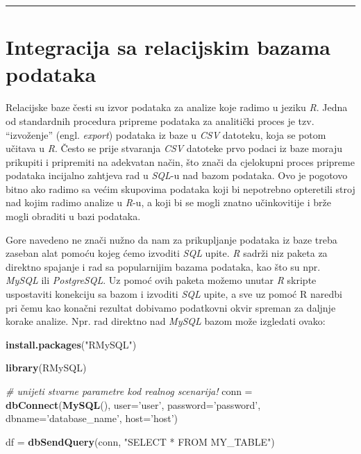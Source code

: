 \documentclass[]{book}
\newenvironment{Shaded}{\begin{snugshade}}{\end{snugshade}}
\newcommand{\KeywordTok}[1]{\textcolor[rgb]{0.13,0.29,0.53}{\textbf{#1}}}
\newcommand{\DataTypeTok}[1]{\textcolor[rgb]{0.13,0.29,0.53}{#1}}
\newcommand{\StringTok}[1]{\textcolor[rgb]{0.31,0.60,0.02}{#1}}
\newcommand{\CommentTok}[1]{\textcolor[rgb]{0.56,0.35,0.01}{\textit{#1}}}
\newcommand{\NormalTok}[1]{#1}
\theoremstyle{definition}
\theoremstyle{definition}
\theoremstyle{definition}
\theoremstyle{remark}
\begin{document}
\begin{center}\rule{0.5\linewidth}{\linethickness}\end{center}

\section{Integracija sa relacijskim bazama
podataka}\label{integracija-sa-relacijskim-bazama-podataka}

Relacijske baze česti su izvor podataka za analize koje radimo u jeziku
\emph{R}. Jedna od standardnih procedura pripreme podataka za analitički
proces je tzv. ``izvoženje'' (engl. \emph{export}) podataka iz baze u
\emph{CSV} datoteku, koja se potom učitava u \emph{R}. Često se prije
stvaranja \emph{CSV} datoteke prvo podaci iz baze moraju prikupiti i
pripremiti na adekvatan način, što znači da cjelokupni proces pripreme
podataka incijalno zahtjeva rad u \emph{SQL}-u nad bazom podataka. Ovo
je pogotovo bitno ako radimo sa većim skupovima podataka koji bi
nepotrebno opteretili stroj nad kojim radimo analize u \emph{R}-u, a
koji bi se mogli znatno učinkovitije i brže mogli obraditi u bazi
podataka.

Gore navedeno ne znači nužno da nam za prikupljanje podataka iz baze
treba zaseban alat pomoću kojeg ćemo izvoditi \emph{SQL} upite. \emph{R}
sadrži niz paketa za direktno spajanje i rad sa popularnijim bazama
podataka, kao što su npr. \emph{MySQL} ili \emph{PostgreSQL}. Uz pomoć
ovih paketa možemo unutar \emph{R} skripte uspostaviti konekciju sa
bazom i izvoditi \emph{SQL} upite, a sve uz pomoć R naredbi pri čemu kao
konačni rezultat dobivamo podatkovni okvir spreman za daljnje korake
analize. Npr. rad direktno nad \emph{MySQL} bazom može izgledati ovako:

\begin{Shaded}
\begin{Highlighting}[]
\KeywordTok{install.packages}\NormalTok{(}\StringTok{"RMySQL"}\NormalTok{)}

\KeywordTok{library}\NormalTok{(RMySQL)}

\CommentTok{# unijeti stvarne parametre kod realnog scenarija!}
\NormalTok{conn =}\StringTok{ }\KeywordTok{dbConnect}\NormalTok{(}\KeywordTok{MySQL}\NormalTok{(), }\DataTypeTok{user=}\StringTok{'user'}\NormalTok{, }\DataTypeTok{password=}\StringTok{'password'}\NormalTok{, }\DataTypeTok{dbname=}\StringTok{'database_name'}\NormalTok{, }\DataTypeTok{host=}\StringTok{'host'}\NormalTok{)}

\NormalTok{df =}\StringTok{ }\KeywordTok{dbSendQuery}\NormalTok{(conn, }\StringTok{"SELECT * FROM MY_TABLE"}\NormalTok{)}
\end{Highlighting}
\end{Shaded}
\end{document}
